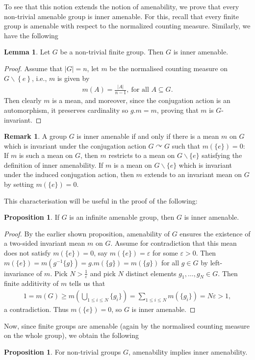 \documentclass[10pt,oneside,openany,final]{memoir}
\theoremstyle{definition}
\newtheorem{lemma}[theorem]{Lemma}
\newtheorem{proposition}[theorem]{Proposition}
\theoremstyle{Break}
\newtheorem*{remark}{Remark}
\def\acts{\curvearrowright}
\begin{document}
To see that this notion extends the notion of amenability, we prove that every non-trivial amenable group is inner amenable. For this, recall that every finite group is amenable with respect to the normalized counting measure. Similarly, we have the following
\begin{lemma}
	Let $G$ be a non-trivial finite group. Then $G$ is inner amenable.
\end{lemma}
\begin{proof}
	Assume that $|G|=n$, let $m$ be the normalised counting measure on $G \backslash\left\{ e \right\}$, i.e., $m$ is given by
	\begin{align*}
		m(A)=\frac{|A|}{n-1},\ \text{for all } A \subseteq G.
	\end{align*}
	Then clearly $m$ is a mean, and moreover, since the conjugation action is an automorphism, it preserves cardinality so $g.m=m$, proving that $m$ is $G$-invariant.
\end{proof}
\begin{remark}
	A group $G$ is inner amenable if and only if there is a mean $m$ on $G$ which is invariant under the conjugation action $G \acts G$ such that $m(\{e\})=0$: If $m$ is such a mean on $G$, then $m$ restricts to a mean on $G\backslash\{e\}$ satisfying the definition of inner amenability. If $m$ is a mean on $G \backslash \{e\}$ which is invariant under the induced conjugation action, then $m$ extends to an invariant mean on $G$ by setting $m(\{e\})=0$.
\end{remark}
This characterisation will be useful in the proof of the following:
\begin{proposition}
	If $G$ is an infinite amenable group, then $G$ is inner amenable.
\end{proposition}
\begin{proof}
	By the earlier shown proposition, amenability of $G$ ensures the existence of a two-sided invariant mean $m$ on $G$. Assume for contradiction that this mean does not satisfy $m(\{e\})=0$, say $m(\{e\})=\varepsilon$ for some $\varepsilon>0$. Then $m(\{e\})=m(g^{-1}\{g\})=g.m(\{g\})=m(\{g\})$ for all $g \in G$ by left-invariance of $m$. Pick $N>\frac{1}{\varepsilon}$ and pick $N$ distinct elements $g_1,\dots,g_N\in G$. Then finite additivity of $m$ tells us that
	\begin{align*}
		1=m(G)\geq m\left(\bigcup_{1 \leq i \leq N}\{g_i\}\right) = \sum_{1 \leq i \leq N}m(\{g_i\}) = N\varepsilon > 1,
	\end{align*}
	a contradiction. Thus $m(\{e\})=0$, so $G$ is inner amenable.
\end{proof}
Now, since finite groups are amenable (again by the normalised counting measure on the whole group), we obtain the following
\begin{proposition}
	For non-trivial groups $G$, amenability implies inner amenability.
\end{proposition}
\end{document}
